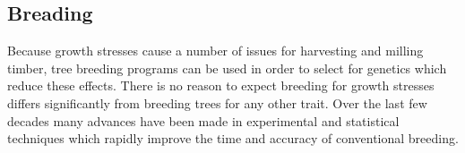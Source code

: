 \subsection{Breading}
Because growth stresses cause a number of issues for harvesting and milling
timber, tree breeding programs can be used in order to select for
genetics which reduce these effects. There is no reason to expect  breeding for
growth stresses differs significantly from breeding trees for
any other trait. Over the last few decades many advances have been made in
experimental and statistical techniques which rapidly improve the time and
accuracy of conventional breeding.